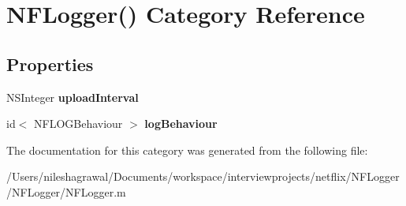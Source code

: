 \hypertarget{category_n_f_logger_07_08}{}\section{N\+F\+Logger() Category Reference}
\label{category_n_f_logger_07_08}
\subsection*{Properties}
\begin{DoxyCompactItemize}
\item 
\mbox{\label{category_n_f_logger_07_08_a3a4d89c9004e1312b8612f526b4f1228}} 
N\+S\+Integer {\bfseries upload\+Interval}
\item 
\mbox{\label{category_n_f_logger_07_08_a0a35f0647c614e34ac9f9710a419090f}} 
id$<$ N\+F\+L\+O\+G\+Behaviour $>$ {\bfseries log\+Behaviour}
\end{DoxyCompactItemize}


The documentation for this category was generated from the following file\+:\begin{DoxyCompactItemize}
\item 
/\+Users/nileshagrawal/\+Documents/workspace/interviewprojects/netflix/\+N\+F\+Logger/\+N\+F\+Logger/N\+F\+Logger.\+m\end{DoxyCompactItemize}

